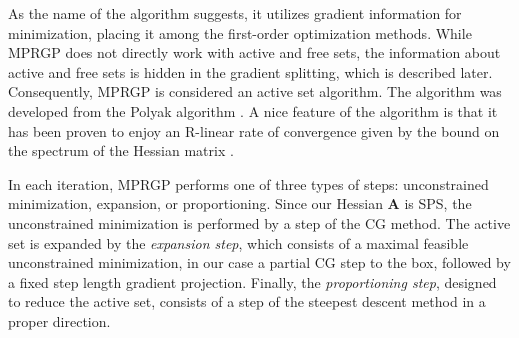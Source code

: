 \documentclass[11pt]{article}
\theoremstyle{plain}
\theoremstyle{definition}
\newcommand{\MA}{\bm{A}}
\begin{document}
As the name of the algorithm suggests, it utilizes gradient information for minimization, placing it among the first-order optimization methods.
While MPRGP does not directly work with active and free sets, the information about active and free sets is hidden in the gradient splitting, which is described later.
Consequently, MPRGP is considered an active set algorithm.
The algorithm was developed from the Polyak algorithm \cite{Polyak1969}.
A nice feature of the algorithm is that it has been proven to enjoy an R-linear rate of convergence given by the bound on the spectrum of the Hessian matrix \cite{Dos-book-09}.

In each iteration, MPRGP performs one of three types of steps: unconstrained minimization, expansion, or proportioning.
Since our Hessian $\MA$ is SPS, the unconstrained minimization is performed by a step of the CG method.
The active set is expanded by the \emph{expansion step}, which consists of a maximal feasible unconstrained minimization, in our case a partial CG step to the box, followed by a fixed step length gradient projection.
Finally, the \emph{proportioning step}, designed to reduce the active set, consists of a step of the steepest descent method in a proper direction.
\end{document}
